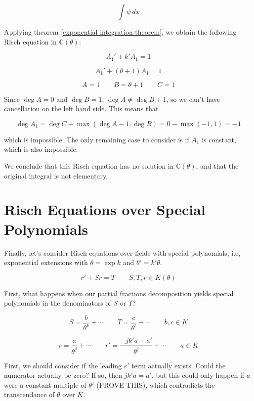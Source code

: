 $$\int \psi\, dx$$

Applying theorem \ref{exponential integration theorem}, we
obtain the following Risch equation in
${\mathbb C}(\theta)$:

$$A_1' + k' A_1 = 1$$

$$A_1' + (\theta + 1) A_1 = 1$$

$$A=1 \qquad B=\theta +1 \qquad C=1$$

Since $\deg A = 0$ and $\deg B=1$, $\deg A \ne \deg B + 1$,
so we can't have cancellation on the left hand side.
This means that

$$\deg A_1 = \deg C - \max(\deg A - 1, \deg B) = 0 - \max(-1, 1) = -1$$

which is impossible.  The only remaining case to consider
is if $A_1$ is constant, which is also impossible.

We conclude that this Risch equation has no solution
in ${\mathbb C}(\theta)$, and that the original integral
is not elementary.

\endexample

\vfill\eject
\section{Risch Equations over Special Polynomials}

Finally, let's consider Risch equations over fields
with special polynomials, i.e, exponential extensions
with $\theta = \exp k$ and $\theta' = k' \theta$.

$$r' + S r = T \qquad S,T,r \in K(\theta)$$

First, what happens when our partial
fractions decomposition yields special polynomials
in the denominators of $S$ or $T$?

$$S = \frac{b}{\theta^k} + \cdots \qquad T = \frac{c}{\theta^l} + \cdots \qquad b,c \in K$$




$$r = \frac{a}{\theta^j} + \cdots  \qquad  r' = \frac{-j k' a + a'}{\theta^{j}} + \cdots \qquad a \in K$$

First, we should consider if the leading $r'$ term actually exists.
Could the numerator actually be zero?  If so, then $j k' a = a'$,
but this could only happen if $a$ were a constant
multiple of $\theta^j$ (PROVE THIS), which contradicts the
transcendance of $\theta$ over $K$.

